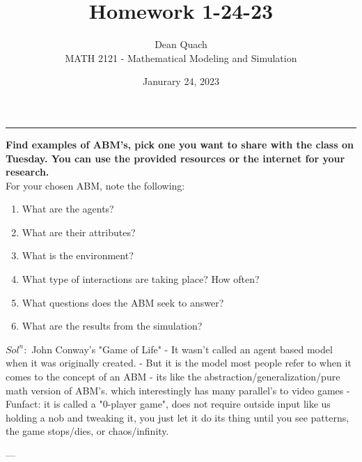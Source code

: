 \documentclass[12pt]{article}
\begin{document}
 
 
 
\title{Homework 1-24-23}%
\author{Dean Quach\\ %
MATH 2121 - Mathematical Modeling and Simulation} %
\date{Janurary 24, 2023}
\maketitle

\hrule
\vspace{20pt}



\textbf{Find examples of ABM's, pick one you want to share with the class on \\Tuesday. You can use the provided resources or the internet for your research.}\\

\noindent For your chosen ABM, note the following:
\begin{enumerate}
\item What are the agents?
\item What are their attributes?
\item What is the environment?
\item What type of interactions are taking place? How often?
\item What questions does the ABM seek to answer?
\item What are the results from the simulation?
\end{enumerate} 

$Sol^n:$ John Conway's "Game of Life"
- It wasn't called an agent based model when it was originally created. 
- But it is the model most people refer to when it comes to the concept of an ABM 
- its like the abstraction/generalization/pure math version of ABM's. which interestingly has many parallel's to video games
- Funfact: it is called a "0-player game", does not require outside input like us holding a nob and tweaking it, you just let it do its thing until you see patterns, the game stops/dies, or chaos/infinity.

---
\end{document}
